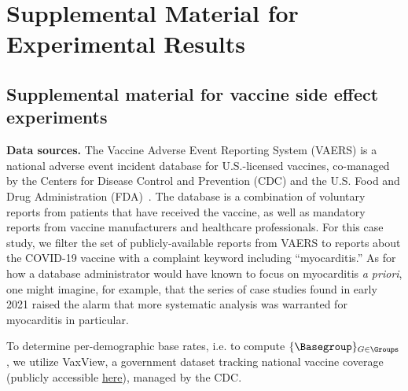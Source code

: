 \section{Supplemental Material for Experimental Results}
\label{app:expts}

\subsection{Supplemental material for vaccine side effect experiments}
\textbf{Data sources.}
The Vaccine Adverse Event Reporting System (VAERS) is a national adverse event incident database for U.S.-licensed vaccines, co-managed by the Centers for Disease Control and Prevention (CDC) and the U.S. Food and Drug Administration (FDA)~\citep{chen1994vaccine,shimabukuro2015safety}. 
The database is a combination of voluntary reports from patients that have received the vaccine, as well as mandatory reports from vaccine manufacturers and healthcare professionals. 
For this case study, we filter the set of publicly-available reports from VAERS to reports about the COVID-19 vaccine with a complaint keyword including ``myocarditis.'' As for how a database administrator would have known to focus on myocarditis \textit{a priori}, one might imagine, for example, that the series of case studies found in early 2021 raised the alarm that more systematic analysis was warranted for myocarditis in particular.

To determine per-demographic base rates, i.e. to compute $\{\Basegroup\}_{G\in\Groups}$, we utilize 
VaxView, a government dataset tracking national vaccine coverage (publicly accessible \href{https://www.cdc.gov/vaccines/data-reporting/}{here}), managed by the CDC. 

